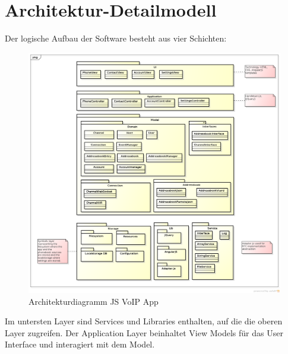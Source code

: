 \section{Architektur-Detailmodell}
	Der logische Aufbau der Software besteht aus vier Schichten:
	\begin{figure}[H]
		\centering
		\includegraphics[width=1\textwidth]{../architekturanalayse/img/architecture.png}
		\caption{Architekturdiagramm JS VoIP App}
	\end{figure}
	Im untersten Layer sind Services und Libraries enthalten, auf die die oberen Layer zugreifen.
	Der Application Layer beinhaltet View Models für das User Interface und interagiert mit dem Model.
	

